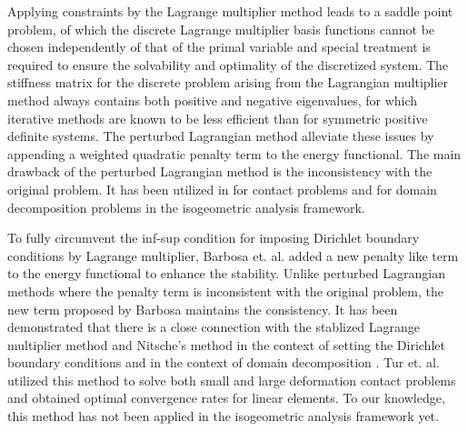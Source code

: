 Applying constraints by the Lagrange multiplier method leads to a saddle point problem, of which the discrete Lagrange multiplier basis functions cannot be chosen independently of that of the primal variable and special treatment is required to ensure the solvability and optimality of the discretized system. The stiffness matrix for the discrete problem arising from the Lagrangian multiplier method always contains both positive and negative eigenvalues, for which iterative methods are known to be less efficient than for symmetric positive definite systems. The perturbed Lagrangian method alleviate these issues by appending a weighted quadratic penalty term to the energy functional. The main drawback of the perturbed Lagrangian method is the inconsistency with the original problem. It has been utilized in \cite{simo1985perturbed} for contact problems and \cite{dornisch2011boundary, apostolatos2015domain} for domain decomposition problems in the isogeometric analysis framework.\par

To fully circumvent the inf-sup condition for imposing Dirichlet boundary conditions by Lagrange multiplier, Barbosa et. al. \cite{barbosa1991finite} added a new penalty like term to the energy functional to enhance the stability. Unlike perturbed Lagrangian methods where the penalty term is inconsistent with the original problem, the new term proposed by Barbosa maintains the consistency. It has been demonstrated that there is a close connection with the stablized Lagrange multiplier method and Nitsche's method in the context of setting the Dirichlet boundary conditions \cite{stenberg1995some} and in the context of domain decomposition \cite{hansbo2005lagrange, hansbo_nitsches_2005, juntunen2015connection}. Tur et. al. \cite{tur2015modified} utilized this method to solve both small and large deformation contact problems and obtained optimal convergence rates for linear elements. To our knowledge, this method has not been applied in the isogeometric analysis framework yet. \par

